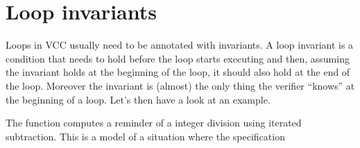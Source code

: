 \section{Loop invariants}

Loops in VCC usually need to be annotated with invariants.
A loop invariant is a condition that needs to hold before
the loop starts executing and then, assuming the invariant holds
at the beginning of the loop, it should also hold at the
end of the loop.
Moreover the invariant is (almost) the only thing the verifier ``knows''
at the beginning of a loop. 
Let's then have a look at an example.


\noindent
The  function computes a reminder of a integer division
using iterated subtraction.
This is a model of a situation where the specification
